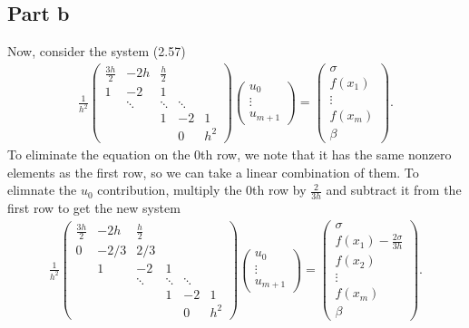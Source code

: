 \documentclass{article}
\begin{document}
\subsection{Part b}
Now, consider the system (2.57)
\begin{align*}
            \frac{1}{h^2}
            \begin{pmatrix}
                \frac{3h}{2} & -2h & \frac{h}{2} \\
                1 & -2 & 1 \\
                & \ddots & \ddots & \ddots \\
                && 1 & -2 & 1 \\
                &&& 0 & h^2
            \end{pmatrix}
            \begin{pmatrix}
                u_0 \\\vdots \\ u_{m+1}
            \end{pmatrix}
            =
            \begin{pmatrix}
                \sigma \\ f(x_1)\\ \vdots \\ f(x_m) \\ \beta
            \end{pmatrix}.
        \end{align*}
To eliminate the equation on the $0$th row, we note that it has the same nonzero elements as the first row, so we can take a linear combination of them. To elimnate the $u_0$ contribution, multiply the 0th row by $\frac{2}{3h}$ and subtract it from the first row to get the new system
\begin{align*}
            \frac{1}{h^2}
            \begin{pmatrix}
                \frac{3h}{2} & -2h & \frac{h}{2} \\
                0 & -2/3 & 2/3 \\
                & 1 &-2 &1\\
                && \ddots & \ddots & \ddots \\
                &&& 1 & -2 & 1 \\
                &&&& 0 & h^2
            \end{pmatrix}
            \begin{pmatrix}
                u_0 \\\vdots \\ u_{m+1}
            \end{pmatrix}
            =
            \begin{pmatrix}
                \sigma \\ f(x_1)-\frac{2\sigma}{3h}\\ f(x_2)\\ \vdots \\ f(x_m) \\ \beta
            \end{pmatrix}.
        \end{align*}
\end{document}
